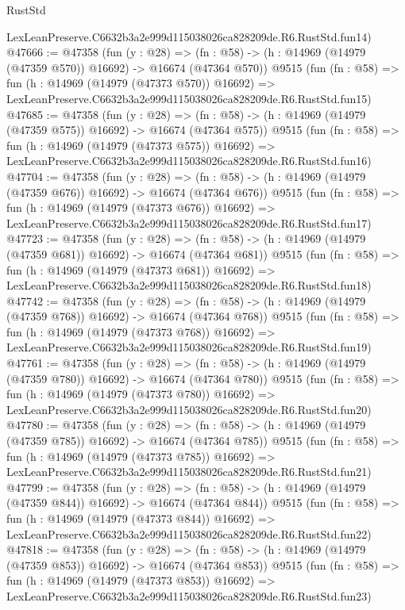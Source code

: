 \begin{lexlean}{RustStd}
\begin{coremodule}
    LexLeanPreserve.C6632b3a2e999d115038026ca828209de.R6.RustStd.fun14)
@47666 := @47358
    (fun (y : @28) =>
    (fn : @58) -> (h : @14969 (@14979 (@47359 @570)) @16692) -> @16674 (@47364 @570))
    @9515
    (fun (fn : @58) =>
    fun (h : @14969 (@14979 (@47373 @570)) @16692) =>
    LexLeanPreserve.C6632b3a2e999d115038026ca828209de.R6.RustStd.fun15)
@47685 := @47358
    (fun (y : @28) =>
    (fn : @58) -> (h : @14969 (@14979 (@47359 @575)) @16692) -> @16674 (@47364 @575))
    @9515
    (fun (fn : @58) =>
    fun (h : @14969 (@14979 (@47373 @575)) @16692) =>
    LexLeanPreserve.C6632b3a2e999d115038026ca828209de.R6.RustStd.fun16)
@47704 := @47358
    (fun (y : @28) =>
    (fn : @58) -> (h : @14969 (@14979 (@47359 @676)) @16692) -> @16674 (@47364 @676))
    @9515
    (fun (fn : @58) =>
    fun (h : @14969 (@14979 (@47373 @676)) @16692) =>
    LexLeanPreserve.C6632b3a2e999d115038026ca828209de.R6.RustStd.fun17)
@47723 := @47358
    (fun (y : @28) =>
    (fn : @58) -> (h : @14969 (@14979 (@47359 @681)) @16692) -> @16674 (@47364 @681))
    @9515
    (fun (fn : @58) =>
    fun (h : @14969 (@14979 (@47373 @681)) @16692) =>
    LexLeanPreserve.C6632b3a2e999d115038026ca828209de.R6.RustStd.fun18)
@47742 := @47358
    (fun (y : @28) =>
    (fn : @58) -> (h : @14969 (@14979 (@47359 @768)) @16692) -> @16674 (@47364 @768))
    @9515
    (fun (fn : @58) =>
    fun (h : @14969 (@14979 (@47373 @768)) @16692) =>
    LexLeanPreserve.C6632b3a2e999d115038026ca828209de.R6.RustStd.fun19)
@47761 := @47358
    (fun (y : @28) =>
    (fn : @58) -> (h : @14969 (@14979 (@47359 @780)) @16692) -> @16674 (@47364 @780))
    @9515
    (fun (fn : @58) =>
    fun (h : @14969 (@14979 (@47373 @780)) @16692) =>
    LexLeanPreserve.C6632b3a2e999d115038026ca828209de.R6.RustStd.fun20)
@47780 := @47358
    (fun (y : @28) =>
    (fn : @58) -> (h : @14969 (@14979 (@47359 @785)) @16692) -> @16674 (@47364 @785))
    @9515
    (fun (fn : @58) =>
    fun (h : @14969 (@14979 (@47373 @785)) @16692) =>
    LexLeanPreserve.C6632b3a2e999d115038026ca828209de.R6.RustStd.fun21)
@47799 := @47358
    (fun (y : @28) =>
    (fn : @58) -> (h : @14969 (@14979 (@47359 @844)) @16692) -> @16674 (@47364 @844))
    @9515
    (fun (fn : @58) =>
    fun (h : @14969 (@14979 (@47373 @844)) @16692) =>
    LexLeanPreserve.C6632b3a2e999d115038026ca828209de.R6.RustStd.fun22)
@47818 := @47358
    (fun (y : @28) =>
    (fn : @58) -> (h : @14969 (@14979 (@47359 @853)) @16692) -> @16674 (@47364 @853))
    @9515
    (fun (fn : @58) =>
    fun (h : @14969 (@14979 (@47373 @853)) @16692) =>
    LexLeanPreserve.C6632b3a2e999d115038026ca828209de.R6.RustStd.fun23)

\end{coremodule}
\end{lexlean}
